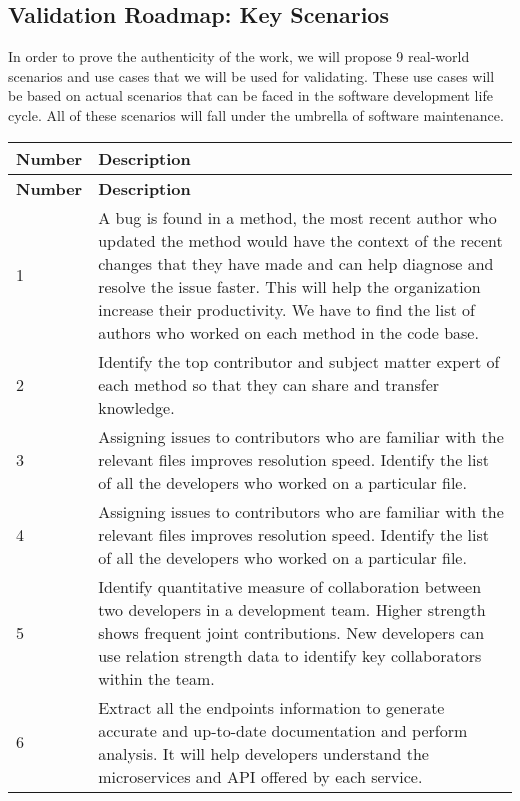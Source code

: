 \subsection{Validation Roadmap: Key Scenarios}

In order to prove the authenticity of the work, we will propose 9 real-world scenarios and use cases that we will be used for validating. These use cases will be based on actual scenarios that can be faced in the software development life cycle. All of these scenarios will fall under the umbrella of software maintenance.

\vspace{1cm} 
\noindent
\begin{longtable}{|p{2cm}|p{12cm}|}
\hline
\textbf{Number} & \textbf{Description} \\ \hline
\endfirsthead
\hline
\textbf{Number} & \textbf{Description} \\ \hline
\endhead
\hline
\endfoot
\endlastfoot

1 & A bug is found in a method, the most recent author who updated the method would have the context of the recent changes that they have made and can help diagnose and resolve the issue faster. This will help the organization increase their productivity. We have to find the list of authors who worked on each method in the code base.\\ \hline

2 & Identify the top contributor and subject matter expert of each method so that they can share and transfer knowledge.\\ \hline

3 & Assigning issues to contributors who are familiar
with the relevant files improves resolution speed. Identify the list of all the developers who worked on a particular file.\\ \hline

4 & Assigning issues to contributors who are familiar
with the relevant files improves resolution speed. Identify the list of all the developers who worked on a particular file.\\ \hline

5 & Identify quantitative measure of collaboration
between two developers in a development team. Higher strength shows frequent joint contributions. New developers can use relation strength data to identify key collaborators within the team.\\ \hline

6 & Extract all the endpoints information to generate accurate and up-to-date documentation and perform analysis. It will help developers understand the microservices and API offered by each service.\\ \hline


\end{longtable}
